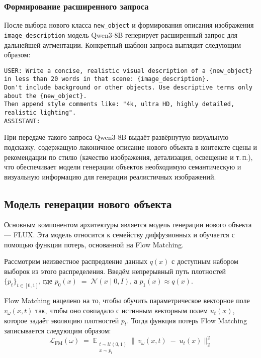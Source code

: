 \subsubsection{Формирование расширенного запроса}
После выбора нового класса \texttt{new\_object} и формирования описания изображения \texttt{image\_description} модель Qwen3-8B\cite{yang2025qwen3technicalreport} генерирует расширенный запрос для дальнейшей аугментации. Конкретный шаблон запроса выглядит следующим образом:
\begin{verbatim}
USER: Write a concise, realistic visual description of a {new_object} 
in less than 20 words in that scene: {image_description}. 
Don't include background or other objects. Use descriptive terms only 
about the {new_object}. 
Then append style comments like: "4k, ultra HD, highly detailed, 
realistic lighting". 
ASSISTANT:
\end{verbatim}При передаче такого запроса Qwen3-8B выдаёт развёрнутую визуальную подсказку, содержащую лаконичное описание нового объекта в контексте сцены и рекомендации по стилю (качество изображения, детализация, освещение и т.\,п.), что обеспечивает модели генерации объектов необходимую семантическую и визуальную информацию для генерации реалистичных изображений.


\subsection{Модель генерации нового объекта}

Основным компонентом архитектуры является модель генерации нового объекта — FLUX\cite{flux2024}. Эта модель относится к семейству диффузионных и обучается с помощью функции потерь, основанной на Flow Matching\cite{lipman2023flowmatchinggenerativemodeling}.

Рассмотрим неизвестное распредление данных \(q(x)\) с доступным набором выборок из этого распределения. Введём непрерывный путь плотностей \(\{p_t\}_{t\in[0,1]}\), где  
$p_0(x) \;=\; \mathcal{N}(x\mid 0, I)$, а \(p_1(x)\approx q(x)\).

Flow Matching нацелено на то, чтобы обучить параметрическое векторное поле \(v_\omega(x,t)\) так, чтобы оно совпадало с истинным векторным полем \(u_t(x)\), которое задаёт эволюцию плотностей \(p_t\).
Тогда функция потерь Flow Matching записывается следующим образом:
\[
\mathcal{L}_{\mathrm{FM}}(\omega)
\;=\;
\mathbb{E}_{\substack{t\sim \mathcal{U}(0,1) \\ x\sim p_t}}
\bigl\|\,v_\omega(x,t)\;-\;u_t(x)\bigr\|^2_2
\]

